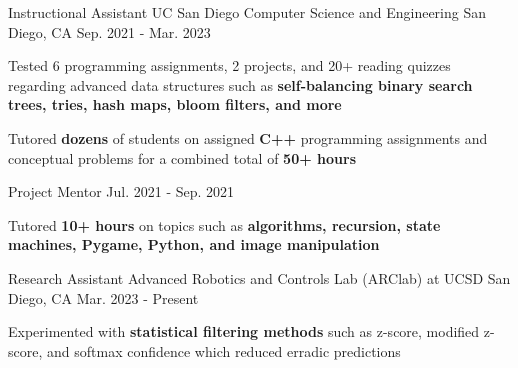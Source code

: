 \begin{cventries}
  \cvtwoentry
    {Instructional Assistant}
    {UC San Diego Computer Science and Engineering} %
    {San Diego, CA} %
    {Sep. 2021 - Mar. 2023}
    {
      \begin{cvitems}
        \item {Tested 6 programming assignments, 2 projects, and 20+ reading quizzes regarding advanced data structures such as \textbf{self-balancing binary search trees, tries, hash maps, bloom filters, and more}}
        \item {Tutored \textbf{dozens} of students on assigned \textbf{C++} programming assignments and conceptual problems for a combined total of \textbf{50+ hours}}
      \end{cvitems}
    }
    {Project Mentor} %
    {Jul. 2021 - Sep. 2021} %
    {
      \begin{cvitems} %
        \item {Tutored \textbf{10+ hours} on topics such as \textbf{algorithms, recursion, state machines, Pygame, Python, and image manipulation}}
      \end{cvitems}
    }

    \cventry
      {Research Assistant}
      {Advanced Robotics and Controls Lab (ARClab) at UCSD}
      {San Diego, CA}
      {Mar. 2023 - Present}
      {
        \begin{cvitems}
          \item {Experimented with \textbf{statistical filtering methods} such as z-score, modified z-score, and softmax confidence which reduced erradic predictions} 
        \end{cvitems}
      }


\end{cventries}
